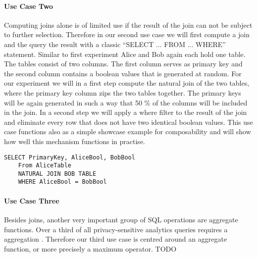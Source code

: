 \paragraph{Use Case Two}
Computing joins alone is of limited use if the result of the join can not be subject to further selection. Therefore in our second use case we will first compute a join and the query the result with a classic ``SELECT ... FROM ... WHERE'' statement. Similar to first experiment Alice and Bob again each hold one table. The tables consist of two columns. The first column serves as primary key and the second column contains a boolean values that is generated at random. For our experiment we will in a first step compute the natural join of the two tables, where the primary key column zips the two tables together. The primary keys will be again generated in such a way that 50 \% of the columns will be included in the join. In a second step we will apply a where filter to the result of the join and eliminate every row that does not have two identical boolean values. This use case functions also as a simple showcase example for composability and will show how well this mechanism functions in practise.    
\label{SQL2_label}		
\begin{lstlisting}[caption={Functional equivalent SQL statement for our second use case}]
	SELECT PrimaryKey, AliceBool, BobBool
	From AliceTable 
	NATURAL JOIN BOB TABLE
	WHERE AliceBool = BobBool
\end{lstlisting}
\paragraph{Use Case Three}
Besides joins, another very important group of SQL operations are aggregate functions. Over a third of all privacy-sensitive analytics queries requires a aggregation \cite{johnson2017practical}. Therefore our third use case is centred around an aggregate function, or more precisely a maximum operator.  TODO
 

